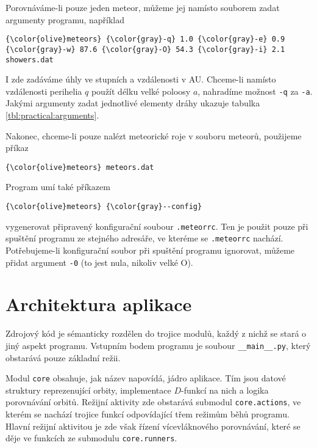 Porovnáváme-li pouze jeden meteor, můžeme jej namísto souborem zadat argumenty programu, například
\begin{Verbatim}[commandchars=\\\{\},gobble=4,formatcom=\small]
    {\color{olive}meteors} {\color{gray}-q} 1.0 {\color{gray}-e} 0.9 {\color{gray}-w} 87.6 {\color{gray}-O} 54.3 {\color{gray}-i} 2.1 showers.dat
\end{Verbatim}
I zde zadáváme úhly ve stupních a vzdálenosti v AU. Chceme-li namísto vzdálenosti perihelia $q$ použít délku velké poloosy $a$, nahradíme možnost \texttt{-q} za \texttt{-a}. Jakými argumenty zadat jednotlivé elementy dráhy ukazuje tabulka \ref{tbl:practical:arguments}.

Nakonec, chceme-li pouze nalézt meteorické roje v souboru meteorů, použijeme příkaz
\begin{Verbatim}[commandchars=\\\{\},gobble=4,formatcom=\small]
    {\color{olive}meteors} meteors.dat
\end{Verbatim}

\medskip

Program umí také příkazem
\begin{Verbatim}[commandchars=\\\{\},gobble=4,formatcom=\small]
    {\color{olive}meteors} {\color{gray}--config}
\end{Verbatim}
vygenerovat připravený konfigurační soubour \texttt{.meteorrc}. Ten je použit pouze při spuštění programu ze stejného adresáře, ve kteréme se \texttt{.meteorrc} nachází. Potřebujeme-li konfigurační soubor při spuštění programu ignorovat, můžeme přidat argument \texttt{-0} (to jest nula, nikoliv velké O).

\section{Architektura aplikace}%
Zdrojový kód je sémanticky rozdělen do trojice modulů, každý z nichž se stará o jiný aspekt programu. Vstupním bodem programu je soubour \texttt{\_\_main\_\_.py}, který obstarává pouze základní režii.

\smallskip

Modul \texttt{core} obsahuje, jak název napovídá, jádro aplikace. Tím jsou datové struktury reprezenující orbity, implementace $D$-funkcí na nich a logika porovnávání orbitů. Režijní aktivity zde obstarává submodul \texttt{core.actions}, ve kterém se nachází trojice funkcí odpovídající třem režimům běhů programu. Hlavní režijní aktivitou je zde však řízení vícevláknového porovnávání, které se děje ve funkcích ze submodulu \texttt{core.runners}.

